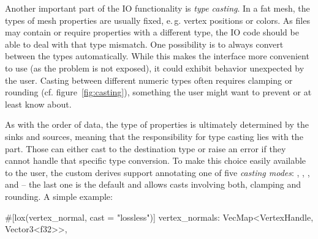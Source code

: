 Another important part of the IO functionality is \emph{type casting}.
In a fat mesh, the types of mesh properties are usually fixed, e.\,g.  vertex positions or \code{[u8; 3]} colors.
As files may contain or require properties with a different type, the IO code should be able to deal with that type mismatch.
One possibility is to always convert between the types automatically.
While this makes the interface more convenient to use (as the problem is not exposed), it could exhibit behavior unexpected by the user.
Casting between different numeric types often requires clamping or rounding (cf. figure~\ref{fig:casting}), something the user might want to prevent or at least know about.

As with the order of data, the type of properties is ultimately determined by the  sinks and sources, meaning that the responsibility for type casting lies with the  part.
Those can either cast to the destination type or raise an error if they cannot handle that specific type conversion.
To make this choice easily available to the user, the custom derives support annotating one of five \emph{casting modes}: , , ,  and  -- the last one is the default and allows casts involving both, clamping and rounding.
A simple example:

\begin{rustcode}
#[lox(vertex_normal, cast = "lossless")]
vertex_normals: VecMap<VertexHandle, Vector3<f32>>,
\end{rustcode}

\newpage


